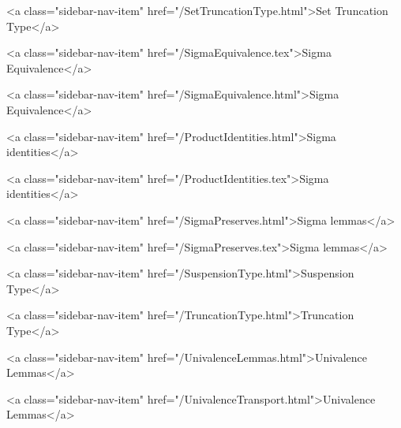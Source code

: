       
    
      
        
          <a class="sidebar-nav-item" href="/SetTruncationType.html">Set Truncation Type</a>
        
      
    
      
        
          <a class="sidebar-nav-item" href="/SigmaEquivalence.tex">Sigma Equivalence</a>
        
      
    
      
        
          <a class="sidebar-nav-item" href="/SigmaEquivalence.html">Sigma Equivalence</a>
        
      
    
      
        
          <a class="sidebar-nav-item" href="/ProductIdentities.html">Sigma identities</a>
        
      
    
      
        
          <a class="sidebar-nav-item" href="/ProductIdentities.tex">Sigma identities</a>
        
      
    
      
        
          <a class="sidebar-nav-item" href="/SigmaPreserves.html">Sigma lemmas</a>
        
      
    
      
        
          <a class="sidebar-nav-item" href="/SigmaPreserves.tex">Sigma lemmas</a>
        
      
    
      
        
          <a class="sidebar-nav-item" href="/SuspensionType.html">Suspension Type</a>
        
      
    
      
        
          <a class="sidebar-nav-item" href="/TruncationType.html">Truncation Type</a>
        
      
    
      
        
          <a class="sidebar-nav-item" href="/UnivalenceLemmas.html">Univalence Lemmas</a>
        
      
    
      
        
          <a class="sidebar-nav-item" href="/UnivalenceTransport.html">Univalence Lemmas</a>
        
